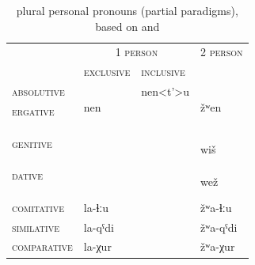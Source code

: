 \documentclass[output=paper,colorlinks,citecolor=brown]{langscibook}
\begin{document}
\begin{table}[p]
	\centering
	\renewcommand{\thetable}{9b}
	\caption{ plural personal pronouns (partial paradigms), based on \citet[257--260]{kibrik1977} and \citet[102]{chumakinacorbett2015}}
	\label{01tab9b}
	\begin{tabularx}{0.85\textwidth}{llll}
		\lsptoprule
		\multicolumn{4}{c}{\textsc{plural}} \\
		\midrule
		& \multicolumn{2}{c}{\textsc{1 person}} & \textsc{2 person} \\
		& \textsc{exclusive} & \textsc{inclusive} & \\
		\midrule
		\textsc{absolutive} & \multirow{5}{*}{nen} & nen<t’>u & \multirow{5}{*}{žʷen} \\
		\arrayrulecolor{white}\cmidrule{3-3}
		\textsc{ergative} & & \cellcolor{gray!50}{nena<w>(u)} & \\
		& & \cellcolor{gray!50}{nena<r>u} & \\
		& & \cellcolor{gray!50}{nena<b>u} & \\
		& & \cellcolor{gray!50}{nen<t’>u etc.} & \\
		\arrayrulecolor{white}
		\hline
		\textsc{genitive} & \multicolumn{1}{l|}{\cellcolor{gray!50}{ulu}} & \cellcolor{gray!50}{la<w>u} & \multirow{4}{*}{wiš} \\
		& \multicolumn{1}{l|}{\cellcolor{gray!50}{d-olo}} & \cellcolor{gray!50}{la<r>u} & \\
		& \multicolumn{1}{l|}{\cellcolor{gray!50}{b-olo}} & \cellcolor{gray!50}{la<b>u} & \\
		& \multicolumn{1}{l|}{\cellcolor{gray!50}{olo etc.}} & \cellcolor{gray!50}{la<t’>u etc.} & \\
		\hline
		\textsc{dative} & \multicolumn{1}{l|}{\cellcolor{gray!50}{w-el}} & \cellcolor{gray!50}{w-ela<w>(u)} & \multirow{4}{*}{wež} \\
		& \multicolumn{1}{l|}{\cellcolor{gray!50}{d-el}} & \cellcolor{gray!50}{d-ela<r>u} & \\
		& \multicolumn{1}{l|}{\cellcolor{gray!50}{b-el}} & \cellcolor{gray!50}{b-ela<b>u} & \\
		&  \multicolumn{1}{l|}{\cellcolor{gray!50}{el etc.}} & \cellcolor{gray!50}{el<t’>u etc.} & \\
		\arrayrulecolor{black}
		\textsc{comitative} & la-ɬːu & & žʷa-ɬːu \\
		\textsc{similative} & la-qˤdi & & žʷa-qˤdi \\
		\textsc{comparative} & la-χur & & žʷa-χur \\

\end{tabularx}
\end{table}
\end{document}
